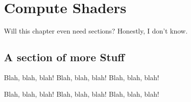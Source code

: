 \chapter{Compute Shaders}

Will this chapter even need sections? Honestly, I don't know. 

\section{A section of more Stuff}

Blah, blah, blah! Blah, blah, blah! Blah, blah, blah!

Blah, blah, blah! Blah, blah, blah! Blah, blah, blah!


